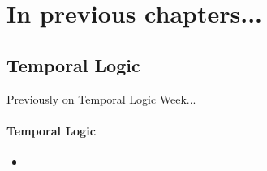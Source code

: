 
\section{In previous chapters...}
\subsection{Temporal Logic}
\begin{frame}{Previously on Temporal Logic Week...}
  \framesubtitle{Temporal Logic}
  \begin{itemize}
	\item
  \end{itemize}

\end{frame}